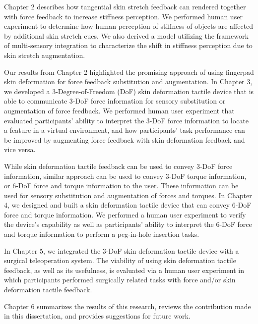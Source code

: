 Chapter 2 describes how tangential skin stretch feedback can rendered together with force feedback to increase stiffness perception. We performed human user experiment to determine how human perception of stiffness of objects are affected by additional skin stretch cues. We also derived a model utilizing the framework of multi-sensory integration to characterize the shift in stiffness perception due to skin stretch augmentation.

Our results from Chapter 2 highlighted the promising approach of using fingerpad skin deformation for force feedback substitution and augmentation. In Chapter 3, we developed a  3-Degree-of-Freedom (DoF) skin deformation tactile device that is able to communicate 3-DoF force information for sensory substitution or augmentation of force feedback. We performed human user experiment that evaluated participants' ability to interpret the 3-DoF force information to locate a feature in a virtual environment, and how participants' task performance can be improved by augmenting force feedback with skin deformation feedback and vice versa.

While skin deformation tactile feedback can be used to convey 3-DoF force information, similar approach can be used to convey 3-DoF torque information, or 6-DoF force and torque information to the user. These information can be used for sensory substitution and augmentation of forces and torques. In Chapter 4, we designed and built a skin deformation tactile device that can convey 6-DoF force and torque information. We performed a human user experiment to verify the device's capability as well as participants' ability to interpret the 6-DoF force and torque information to perform a peg-in-hole insertion tasks. 

In Chapter 5, we integrated the 3-DoF skin deformation tactile device with a surgical teleoperation system. The viability of using skin deformation tactile feedback, as well as its usefulness, is evaluated via a human user experiment in which participants performed surgically related tasks with force and/or skin deformation tactile feedback.

Chapter 6 summarizes the results of this research, reviews the contribution made in this dissertation, and provides suggestions for future work.